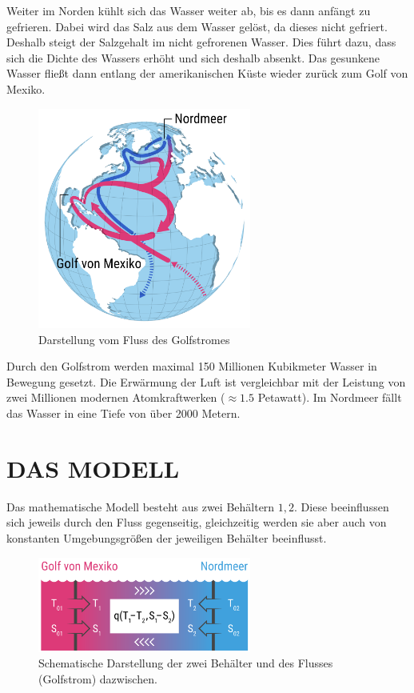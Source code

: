 \documentclass[a4paper,twoside]{article}
\begin{document}
	Weiter im Norden kühlt sich das Wasser weiter ab, bis es dann anfängt zu gefrieren. Dabei wird das Salz aus dem Wasser gelöst, da dieses nicht gefriert. Deshalb steigt der Salzgehalt im nicht gefrorenen Wasser. Dies führt dazu, dass sich die Dichte des Wassers erhöht und sich deshalb absenkt. Das gesunkene Wasser fließt dann entlang der amerikanischen Küste wieder zurück zum Golf von Mexiko.
	\begin{figure}[!h]
  		\centering
 		\includegraphics[width=7cm]{Grafiken/golfstrom_fluss.png}
  		\caption{Darstellung vom Fluss des Golfstromes}
  		\label{fig:flussGolfstrom}
	\end{figure}

Durch den Golfstrom werden maximal 150 Millionen Kubikmeter Wasser in Bewegung gesetzt. 
Die Erwärmung der Luft ist vergleichbar mit der Leistung von zwei Millionen modernen Atomkraftwerken (\(\approx 1.5\) Petawatt).
Im Nordmeer fällt das Wasser in eine Tiefe von über 2000 Metern.
 
	

	
	\section{\uppercase{Das Modell}}\label{sec:Modell}
	
	\noindent Das mathematische Modell besteht aus zwei Behältern \(1,2\). Diese beeinflussen sich jeweils durch den Fluss gegenseitig, gleichzeitig werden sie aber auch von konstanten Umgebungsgrößen der jeweiligen Behälter beeinflusst.
	
	\begin{figure}[!h]
  		\centering
 		\includegraphics[width=7cm]{Grafiken/skizze_modell.png}
  		\caption{Schematische Darstellung der zwei Behälter und des Flusses (Golfstrom) dazwischen.}
  		\label{fig:modell}
	\end{figure}
	
\end{document}
